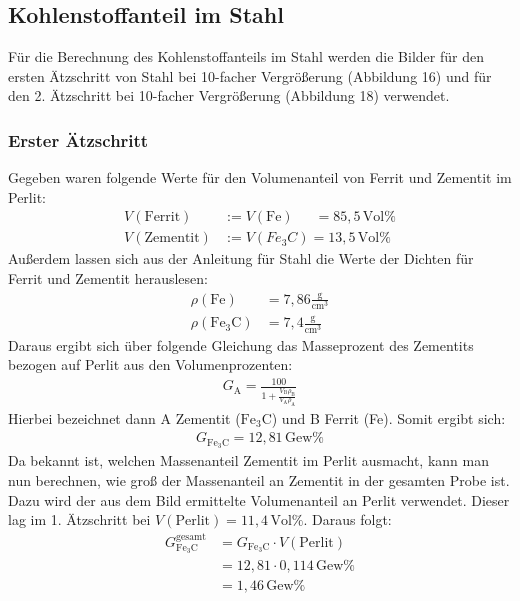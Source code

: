 \documentclass[german,  %
parskip=full,  %
]{scrartcl}
\begin{document}
\subsection{Kohlenstoffanteil im Stahl}
Für die Berechnung des Kohlenstoffanteils im Stahl werden die Bilder für den ersten Ätzschritt von Stahl bei 10-facher Vergrößerung (Abbildung 16) und für den 2. Ätzschritt bei 10-facher Vergrößerung (Abbildung 18) verwendet.
\subsubsection{Erster Ätzschritt}
Gegeben waren folgende Werte für den Volumenanteil von Ferrit und Zementit im Perlit:
\begin{align*}
V(\text{Ferrit}) &:= V(\text{Fe}) \,\,\,\,\,\,\,\,\,= 85,5 \, \text{Vol}\% \\
V(\text{Zementit}) &:= V(\text{$Fe_{3}C$}) = 13,5 \,  \text{Vol}\%
\end{align*}
Außerdem lassen sich aus der Anleitung für Stahl die Werte der Dichten für Ferrit und Zementit herauslesen:
\begin{align*}
\rho(\text{Fe}) &= 7,86 \frac{\text{g}}{\text{cm}^3} \\
\rho(\mathrm{Fe}_{3}\mathrm{C}) &= 7,4 \frac{\text{g}}{\text{cm}^3}
\end{align*}
Daraus ergibt sich über folgende Gleichung das Masseprozent des Zementits bezogen auf Perlit aus den Volumenprozenten:
\begin{align*}
G_{\mathrm{A}} = \frac{100}{1 + \frac{V_{\mathrm{B}} \rho_{\mathrm{B}}}{V_{\mathrm{A}} \rho_{\mathrm{A}}}}
\end{align*}
Hierbei bezeichnet dann A Zementit ($\mathrm{Fe}_{3}\mathrm{C}$) und B Ferrit (Fe). Somit ergibt sich:
\begin{align*}
G_{\mathrm{Fe}_{3}\mathrm{C}} = 12,81 \, \text{Gew}\%
\end{align*}
Da bekannt ist, welchen Massenanteil Zementit im Perlit ausmacht, kann man nun berechnen, wie groß der Massenanteil an Zementit in der gesamten Probe ist. Dazu wird der aus dem Bild ermittelte Volumenanteil an Perlit verwendet. Dieser lag im 1. Ätzschritt bei $V(\text{Perlit}) = 11,4 \, \text{Vol}\%$. Daraus folgt:
\begin{align*}
G_{\mathrm{Fe}_{3}\mathrm{C}}^{\mathrm{gesamt}} &= G_{\mathrm{Fe}_{3}\mathrm{C}} \cdot V(\text{Perlit}) \\
&= 12,81 \cdot 0,114 \, \text{Gew}\% \\
&= 1,46 \, \text{Gew}\%
\end{align*}
\end{document}
